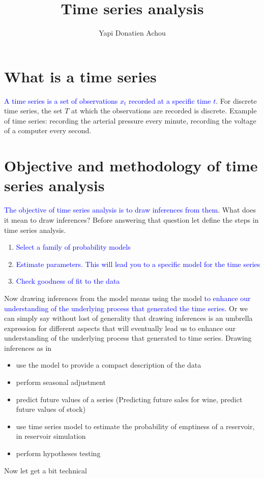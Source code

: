 \documentclass[11pt, oneside]{article}   	%
\title{Time series analysis}
\author{Yapi Donatien Achou}
\begin{document}
\maketitle
\section{What is a time series}
\textcolor{blue}{A time series is a set of observations $x_{t}$ recorded at a specific time $t$}. For discrete time series, the set $T$ at which the observations are recorded is discrete.
Example of time series: recording the arterial pressure every minute, recording the voltage of a computer every second.
\section{Objective and methodology of time series analysis}
\textcolor{blue}{The objective of time series analysis is to draw inferences from them}. What does it mean to draw inferences? Before answering that question let define the steps in time series analysis.
\begin{enumerate}
\item \textcolor{blue}{Select a family of probability models}
\item \textcolor{blue}{Estimate parameters. This will lead you to a specific model for the time series}
\item \textcolor{blue}{Check goodness of fit to the data}
\end{enumerate}
Now drawing inferences from the model means using the model \textcolor{blue}{to enhance our understanding of the underlying process that generated the time series}.
Or we can simply say without lost of generality that drawing inferences is an umbrella expression for different aspects that will eventually lead us to enhance our understanding of the underlying 
process that generated to time series. 
\justify
Drawing inferences as in 
\begin{itemize}
\item use the model to provide a compact description of the data
\item perform seasonal  adjustment
\item predict future values of a series (Predicting future sales for wine, predict future values of stock)
\item use time series model to estimate the probability of emptiness of a reservoir, in reservoir simulation
\item perform hypotheses testing
\end{itemize}
Now let get a bit technical
\end{document}
